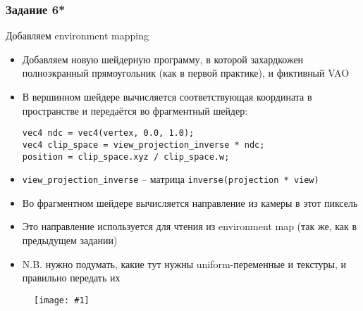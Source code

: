 \documentclass{beamer}
\newcommand{\slideimage}[1]{
  \begin{figure}
    \begin{adjustbox}{width=\textwidth, totalheight=\textheight-2\baselineskip-2\baselineskip,keepaspectratio}
      \texttt{[image: \#1]}
    \end{adjustbox}
  \end{figure}
}
\begin{document}
\begin{frame}[fragile]
\frametitle{Задание 6*}
Добавляем environment mapping
\begin{itemize}
\item Добавляем новую шейдерную программу, в которой захардкожен полноэкранный прямоугольник (как в первой практике), и фиктивный VAO
\item В вершинном шейдере вычисляется соответствующая координата в пространстве и передаётся во фрагментный шейдер:
\begin{verbatim}
vec4 ndc = vec4(vertex, 0.0, 1.0);
vec4 clip_space = view_projection_inverse * ndc;
position = clip_space.xyz / clip_space.w;
\end{verbatim}
\item \verb|view_projection_inverse| -- матрица \verb|inverse(projection * view)|
\item Во фрагментном шейдере вычисляется направление из камеры в этот пиксель
\item Это направление используется для чтения из environment map (так же, как в предыдущем задании)
\item N.B. нужно подумать, какие тут нужны uniform-переменные и текстуры, и правильно передать их
\end{itemize}
\end{frame}

\begin{frame}[fragile]
\slideimage{6.png}
\end{frame}
\end{document}
